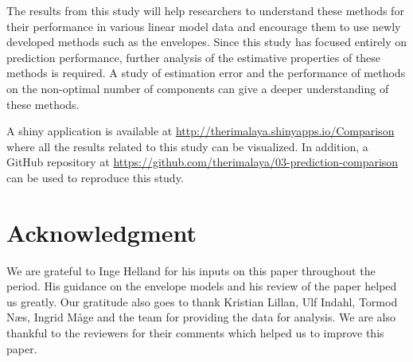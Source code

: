 \documentclass[review]{elsarticle}
\begin{document}
The results from this study will help researchers to understand these methods for their performance in various linear model data and encourage them to use newly developed methods such as the envelopes. Since this study has focused entirely on prediction performance, further analysis of the estimative properties of these methods is required. A study of estimation error and the performance of methods on the non-optimal number of components can give a deeper understanding of these methods.

A shiny application \citep{shiny} is available at \url{http://therimalaya.shinyapps.io/Comparison} where all the results related to this study can be visualized. In addition, a GitHub repository at \url{https://github.com/therimalaya/03-prediction-comparison} can be used to reproduce this study.

\hypertarget{acknowledgment}{%
\section{Acknowledgment}\label{acknowledgment}}

We are grateful to Inge Helland for his inputs on this paper throughout the period. His guidance on the envelope models and his review of the paper helped us greatly. Our gratitude also goes to thank Kristian Lillan, Ulf Indahl, Tormod Næs, Ingrid Måge and the team for providing the data for analysis. We are also thankful to the reviewers for their comments which helped us to improve this paper.

\hypertarget{refs}{}

\hypertarget{appendix-appendix-a}{%
\appendix}



\renewcommand\refname{References}

\end{document}
